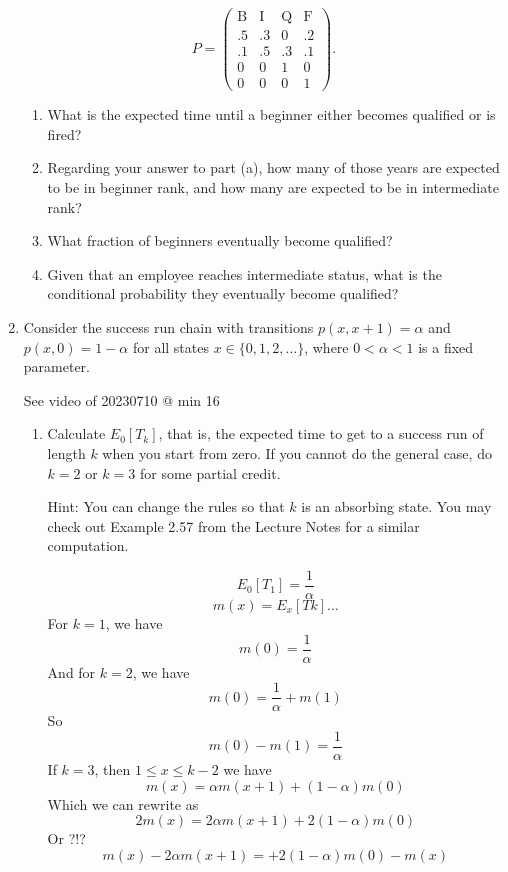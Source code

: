 \documentclass{article} %
\theoremstyle{plain}
\theoremstyle{case}
\begin{document}
\begin{enumerate}[label={\fbox{\textbf{Exercise \#\arabic* :}}}]
$$
P=\left(\begin{array}{cccc}
\mathrm{B} & \mathrm{I} & \mathrm{Q} & \mathrm{F} \\
.5 & .3 & 0 & .2 \\
.1 & .5 & .3 & .1 \\
0 & 0 & 1 & 0 \\
0 & 0 & 0 & 1
\end{array}\right) .
$$
  \begin{enumerate}


    \item What is the expected time until a beginner either becomes qualified or is fired? 
    \item Regarding your answer to part (a), how many of those years are expected to be in beginner rank, and how many are expected to be in intermediate rank?

    \item  What fraction of beginners eventually become qualified?

    \item  Given that an employee reaches intermediate status, what is the conditional probability they eventually become qualified?
  \end{enumerate}

\newpage
  \item Consider the success run chain with transitions $p(x, x+1)=\alpha$ and $p(x, 0)=1-\alpha$ for all states $x \in\{0,1,2, \ldots\}$, where $0<\alpha<1$ is a fixed parameter.

    See video of 20230710 @ min 16

\begin{enumerate}
  \item  Calculate $E_{0}\left[T_{k}\right]$, that is, the expected time to get to a success run of length $k$ when you start from zero. If you cannot do the general case, do $k=2$ or $k=3$ for some partial credit.

Hint: You can change the rules so that $k$ is an absorbing state. You may check out Example 2.57 from the Lecture Notes for a similar computation.

    \[ E_0[T_1] = \frac{1}{\alpha}  \]
    \[ m(x) = E_x[Tk] \dots \]
    For $k=1$, we have
    \[ m(0) = \frac{1}{\alpha} \]
    And for $k=2$, we have
    \[ m(0) = \frac{1}{\alpha} + m(1) \]
    So
      \[ m(0) - m(1) = \frac{1}{\alpha}  \]
    If $k=3$, then $1 \leq x \leq k-2$ we have
    \[ m(x) = \alpha m(x+1) + (1- \alpha) m(0) \]
    Which we can rewrite as
    \[ 2m(x) = 2\alpha m(x+1) + 2(1- \alpha) m(0) \]
    Or ?!?
    \[ m(x) - 2 \alpha m(x+1) = + 2(1- \alpha) m(0) - m(x) \]


\end{enumerate}
\end{enumerate}
\end{document}

